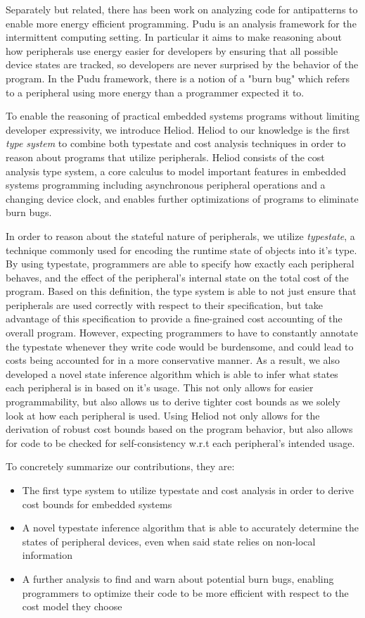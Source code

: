 Separately but related, there has been work on analyzing code for antipatterns to enable more energy efficient programming. Pudu \cite{pudu} is an analysis framework for the intermittent computing setting. In particular it aims to make reasoning about how peripherals use energy easier for developers by ensuring that all possible device states are tracked, so developers are never surprised by the behavior of the program. In the Pudu framework, there is a notion of a "burn bug" which refers to a peripheral using more energy than a programmer expected it to. 

To enable the reasoning of practical embedded systems programs without limiting developer expressivity, we introduce Heliod. Heliod to our knowledge is the first \textit{type system} to combine both typestate and cost analysis techniques in order to reason about programs that utilize peripherals. Heliod consists of the cost analysis type system, a core calculus to model important features in embedded systems programming including asynchronous peripheral operations and a changing device clock, and enables further optimizations of programs to eliminate burn bugs.

In order to reason about the stateful nature of peripherals, we utilize \textit{typestate}, a technique commonly used for encoding the runtime state of objects into it's type. By using typestate, programmers are able to specify how exactly each peripheral behaves, and the effect of the peripheral's internal state on the total cost of the program. Based on this definition, the type system is able to not just ensure that peripherals are used correctly with respect to their specification, but take advantage of this specification to provide a fine-grained cost accounting of the overall program. However, expecting programmers to have to constantly annotate the typestate whenever they write code would be burdensome, and could lead to costs being accounted for in a more conservative manner. As a result, we also developed a novel state inference algorithm which is able to infer what states each peripheral is in based on it's usage. This not only allows for easier programmability, but also allows us to derive tighter cost bounds as we solely look at how each peripheral is used. Using Heliod not only allows for the derivation of robust cost bounds based on the program behavior, but also allows for code to be checked for self-consistency w.r.t each peripheral's intended usage. 

To concretely summarize our contributions, they are: 
\begin{itemize}
  \item The first type system to utilize typestate and cost analysis in order to derive cost bounds for embedded systems
  \item A novel typestate inference algorithm that is able to accurately determine the states of peripheral devices, even when said state relies on non-local information
  \item A further analysis to find and warn about potential burn bugs, enabling programmers to optimize their code to be more efficient with respect to the cost model they choose
\end{itemize}

